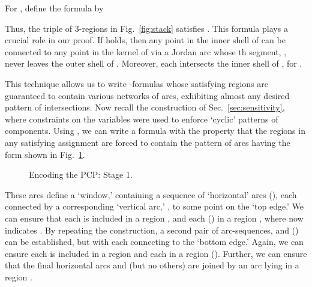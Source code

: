 \documentclass{article}
\begin{document}
For , define the formula  by 

Thus, the triple of 3-regions in Fig.~\ref{fig:stack} satisfies
. This formula plays a
crucial role in our proof.  If 
holds, then any point  in the inner shell  of
 can be connected to any point  in the kernel
 of  via a Jordan arc
 whose th segment, , never leaves
the outer shell  of . Moreover, each 
intersects the inner shell  of
, for .

This technique allows us to write -formulas whose satisfying
regions are guaranteed to contain various networks of arcs, exhibiting
almost any desired pattern of intersections. Now recall the
construction of Sec.~\ref{sec:sensitivity}, where constraints on the
variables  were used to enforce `cyclic' patterns of
components. Using , we can
write a formula with the property that the regions in any satisfying
assignment are forced to contain the pattern of arcs having the form
shown in Fig.~\ref{fig:Summary1}.
\begin{figure}[h]
\begin{center}
\end{center}
\vspace*{-2mm}
\caption{Encoding the PCP: Stage 1.}
\label{fig:Summary1}
\end{figure}
These arcs define a `window,' containing a sequence  of
`horizontal' arcs (), each connected by a
corresponding `vertical arc,' , to some point on the `top
edge.' We can ensure that each  is included in a region
, and each  () in a region
, where  now indicates . By
repeating the construction, a second pair of arc-sequences,
 and  () can be
established, but with each  connecting  to the
`bottom edge.' Again, we can ensure each  is included in a
region  and each  in a region  (). Further, we can ensure that the final horizontal arcs
 and  (but no others) are joined by an arc
 lying in a region .
\end{document}
